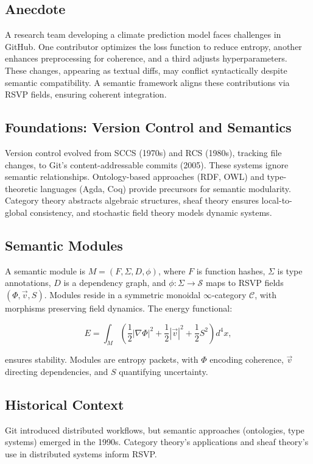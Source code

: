 \documentclass[12pt]{article}
\begin{document}
\subsection{Anecdote}
A research team developing a climate prediction model faces challenges in GitHub. One contributor optimizes the loss function to reduce entropy, another enhances preprocessing for coherence, and a third adjusts hyperparameters. These changes, appearing as textual diffs, may conflict syntactically despite semantic compatibility. A semantic framework aligns these contributions via RSVP fields, ensuring coherent integration.

\subsection{Foundations: Version Control and Semantics}
Version control evolved from SCCS (1970s) and RCS (1980s), tracking file changes, to Git’s content-addressable commits (2005). These systems ignore semantic relationships. Ontology-based approaches (RDF, OWL) and type-theoretic languages (Agda, Coq) provide precursors for semantic modularity. Category theory abstracts algebraic structures, sheaf theory ensures local-to-global consistency, and stochastic field theory models dynamic systems.

\subsection{Semantic Modules}
A semantic module is $M = (F, \Sigma, D, \phi)$, where $F$ is function hashes, $\Sigma$ is type annotations, $D$ is a dependency graph, and $\phi : \Sigma \to \mathcal{S}$ maps to RSVP fields $(\Phi, \vec{v}, S)$. Modules reside in a symmetric monoidal $\infty$-category $\mathcal{C}$, with morphisms preserving field dynamics. The energy functional:

\[
E = \int_M \left( \frac{1}{2} |\nabla \Phi|^2 + \frac{1}{2} |\vec{v}|^2 + \frac{1}{2} S^2 \right) d^4x,
\]

ensures stability. Modules are entropy packets, with $\Phi$ encoding coherence, $\vec{v}$ directing dependencies, and $S$ quantifying uncertainty.

\subsection{Historical Context}
Git introduced distributed workflows, but semantic approaches (ontologies, type systems) emerged in the 1990s. Category theory’s applications \cite{lawvere2009conceptual} and sheaf theory’s use in distributed systems inform RSVP.
\end{document}
